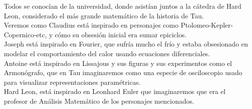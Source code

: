 \documentclass[preview]{standalone}
\begin{document}
\begin{center}
Todos se conocían de la universidad, donde asistían juntos a la cátedra de Hard Leon, considerado el más grande matemático de la historia de Tau.
$$ $$ 
Veremos como Claudius está inspirado en personajes como Ptolomeo-Kepler-Copernico-etc, y cómo su obsesión inicial era sumar epiciclos.  
$$ $$ 
Joseph está inspirado en Fourier, que sufría mucho el frío y estaba obsesionado en modelar el comportamiento del calor usando ecuaciones diferenciales.  
$$ $$ 
Antoine está inspirado en Lissajous y sus figuras y sus experimentos como el Armonógrafo, que en Tau imaginaremos como una especie de osciloscopio usado para visualizar representaciones paramétricas.
$$ $$ 
Hard Leon, está inspirado en Leonhard Euler que imaginaremos que era el profesor de Análisis Matemático de los personajes mencionados.
\end{center}
\end{document}
